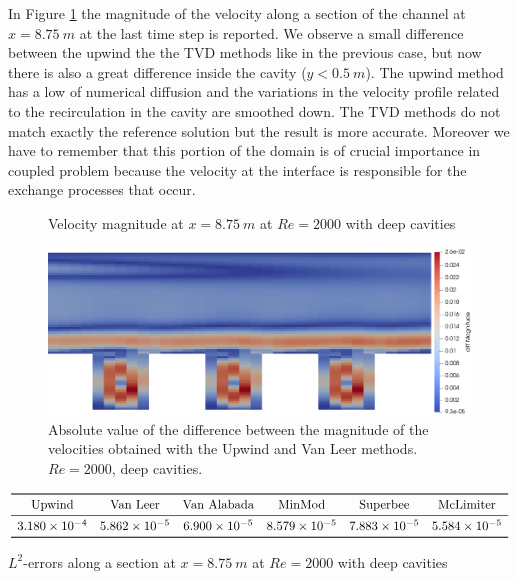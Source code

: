 \documentclass[11pt, a4paper]{article}
\theoremstyle{definition}
\begin{document}
In Figure \ref{fig:line_comp_highstep} the magnitude of the velocity along a 
section of the channel at $x=\SI{8.75}{m}$ at the last time step is reported. 
We 
observe a small difference between the upwind the the TVD methods like in the 
previous case, but now there is also a great difference inside the cavity 
($y<\SI{0.5}{m}$). The upwind method has a low of numerical diffusion and the 
variations in the velocity profile related to the recirculation in the cavity 
are smoothed down. The TVD methods do not match exactly the reference solution 
but the result is more accurate. Moreover we have to remember that this portion 
of the domain is of crucial importance in coupled problem because the velocity 
at the interface is responsible for the exchange processes that occur.
\begin{figure}[h]
	\centering
	
	\caption{Velocity magnitude at $ x = \SI{8.75}{m}$ at $Re = 2000$ with deep 
	cavities}
	\label{fig:line_comp_highstep}
\end{figure}

\begin{figure}[h]
	\centering
	\includegraphics[width=\textwidth]{rough_channel_high_diff}
	\caption{Absolute value of the difference between the magnitude of the 
	velocities obtained with the Upwind and Van Leer methods. $Re = 2000$,
	deep cavities.}
	\label{fig:cha_diff}
\end{figure}

\begin{table}[h]
	\scriptsize
	\centering
	\[
	\begin{array}{cccccc}
	\toprule
	\text{Upwind} & \text{Van Leer} & \text{Van Alabada} & \text{MinMod} & 
	\text{Superbee} & \text{McLimiter} \\ 
	\midrule
	3.180 \times 10^{-4} & 5.862 \times 10^{-5} & 6.900 \times 10^{-5} & 8.579 
	\times 10^{-5} & 7.883 \times 10^{-5} & 5.584 \times 10^{-5}\\
	\bottomrule
	\end{array}
	\]
	\caption{$L^2$-errors along a section at $x=\SI{8.75}{m}$ at $Re = 2000$ 
	with deep cavities}
	\label{tab:err_high}
\end{table}
\end{document}
